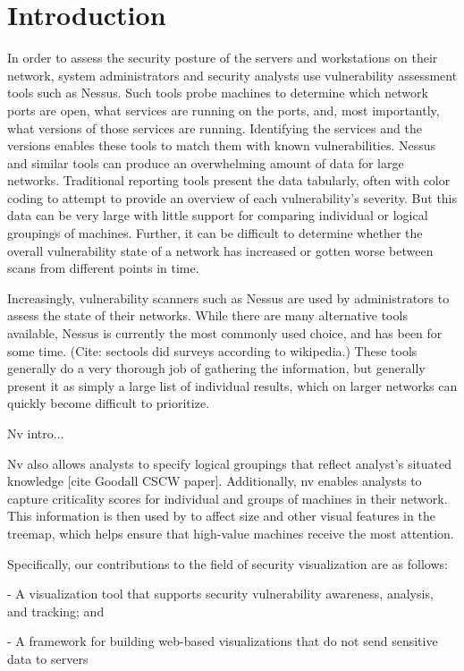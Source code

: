 \documentclass{acm_proc_article-sp}
\begin{document}
\section{Introduction}
In order to assess the security posture of the servers and workstations on their network, system administrators and security analysts use vulnerability assessment tools such as Nessus. Such tools probe machines to determine which network ports are open, what services are running on the ports, and, most importantly, what versions of those services are running. Identifying the services and the versions enables these tools to match them with known vulnerabilities. Nessus and similar tools can produce an overwhelming amount of data for large networks. Traditional reporting tools present the data tabularly, often with color coding to attempt to provide an overview of each vulnerability's severity. But this data can be very large with little support for comparing individual or logical groupings of machines. Further, it can be difficult to determine whether the overall vulnerability state of a network has increased or gotten worse between scans from different points in time.

Increasingly, vulnerability scanners such as Nessus are used by administrators to assess the state of their networks.  While there are many alternative tools available, Nessus is currently the most commonly used choice, and has been for some time. (Cite: sectools did surveys according to wikipedia.)  These tools generally do a very thorough job of gathering the information, but generally present it as simply a large list of individual results, which on larger networks can quickly become difficult to prioritize.

Nv intro...

Nv also allows analysts to specify logical groupings that reflect analyst's situated knowledge [cite Goodall CSCW paper]. Additionally, nv enables analysts to capture criticality scores for individual and groups of machines in their network. This information is then used by to affect size and other visual features in the treemap, which helps ensure that high-value machines receive the most attention.

Specifically, our contributions to the field of security visualization are as follows:

- A visualization tool that supports security vulnerability awareness, analysis, and tracking; and

- A framework for building web-based visualizations that do not send sensitive data to servers
\end{document}
